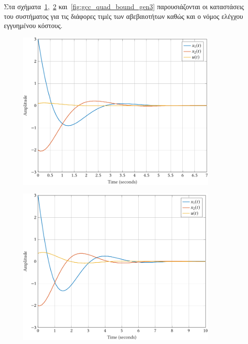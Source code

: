 Στα σχήματα~\ref{fig:gcc_quad_bound_gen1},~\ref{fig:gcc_quad_bound_gen2}
και~\ref{fig:gcc_quad_bound_gen3} παρουσιάζονται οι καταστάσεις του συστήματος για
τις διάφορες τιμές των αβεβαιοτήτων καθώς και ο νόμος ελέγχου εγγυημένου
κόστους.
\begin{figure}[h]
    \centering
    \includegraphics[width=0.9\textwidth]{figures/gcc_quad_bound_gen1.pdf}
    \label{fig:gcc_quad_bound_gen1}
\end{figure}
\begin{figure}[h]
    \centering
    \includegraphics[width=0.9\textwidth]{figures/gcc_quad_bound_gen2.pdf}
    \label{fig:gcc_quad_bound_gen2}
\end{figure}
